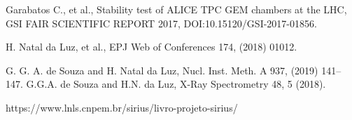 \documentclass{report}
\begin{document}
\begin{thebibliography}{9}
%
 Garabatos C., et al., Stability test of ALICE TPC GEM chambers at the LHC, GSI FAIR SCIENTIFIC REPORT 2017, DOI:10.15120/GSI-2017-01856.
%

 H. Natal da Luz, et al., EPJ Web of Conferences 174, (2018) 01012.




 G. G. A. de Souza and  H. Natal da Luz, Nucl. Inst. Meth. A 937, (2019) 141–147.
\thispagestyle{plain}
 G.G.A. de Souza and H.N. da Luz, X-Ray Spectrometry 48, 5 (2018).

 https://www.lnls.cnpem.br/sirius/livro-projeto-sirius/
\thispagestyle{plain}



\end{thebibliography}
\newpage
\end{document}
